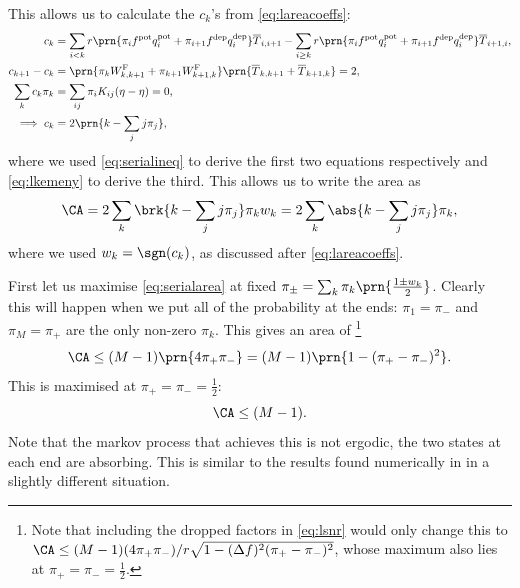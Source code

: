 \documentclass[12pt]{article}
\newcommand{\eqm}{\pi}
\newcommand{\fptm}{T}
\newcommand{\fptbm}{\overline{\fptm}}
\newcommand{\wm}{w}
\newcommand{\w}{\mathbf{\wm}}
\newcommand{\Wm}{W}
\newcommand{\encm}{K}
\newcommand{\frgm}{\Wm^{\mathrm{F}}}
\newcommand{\pot}{^{\text{pot}}}
\newcommand{\dep}{^{\text{dep}}}
\begin{document}
This allows us to calculate the $c_k$'s from \cref{eq:lareacoeffs}:
%
\begin{equation}\label{eq:serialareacoeff}
\begin{aligned}
  c_k &= \sum_{i<k} r\prn{\eqm_{i} f\pot q\pot_i + \eqm_{i+1} f\dep q\dep_i} \fptbm_{i,i+1}
    - \sum_{i\geq k} r\prn{\eqm_{i} f\pot q\pot_i + \eqm_{i+1} f\dep q\dep_i} \fptbm_{i+1,i}
  ,\\
  c_{k+1} - c_k &= \prn{\eqm_{k} \frgm_{k,k+1} + \eqm_{k+1} \frgm_{k+1,k}}
                    \prn{\fptbm_{k,k+1} + \fptbm_{k+1,k}}
    = 2,\\
  \sum_k c_k \eqm_k &= \sum_{ij} \eqm_i \encm_{ij} (\eta-\eta) = 0,\\
  \implies c_k &= 2 \prn{k - \sum_j j\eqm_j},
\end{aligned}
\end{equation}
%
where we used \cref{eq:serialineq} to derive the first two equations respectively and \cref{eq:lkemeny} to derive the third. 
This allows us to write the area as
%
\begin{equation}\label{eq:serialarea}
  \CA = {2} \sum_k \brk{k - \sum_j j\eqm_j} \eqm_k \wm_k
    = {2} \sum_k \abs{k - \sum_j j\eqm_j} \eqm_k ,
\end{equation}
%
where we used $\wm_k=\sgn(c_k)$, as discussed after \cref{eq:lareacoeffs}.

First let us maximise \cref{eq:serialarea} at fixed $\eqm_\pm = \sum_k \eqm_k \prn{\frac{1\pm\wm_k}{2}}$.
Clearly this will happen when we put all of the probability at the ends: $\eqm_1=\eqm_-$ and $\eqm_M=\eqm_+$ are the only non-zero $\eqm_k$.
This gives an area of
\footnote{Note that including the dropped factors in \cref{eq:lsnr} would only change this to \(\CA \leq (M-1)(4\eqm_+\eqm_-)/r\sqrt{1 - (\Delta f)^2(\eqm_+ - \eqm_-)^2}\), whose maximum also lies at \(\eqm_+=\eqm_-= \frac{1}{2}\).}
%
\begin{equation}\label{eq:serialextarea}
  \CA \leq (M-1) \prn{4\eqm_+\eqm_-} = (M-1)\prn{1 - (\eqm_+ - \eqm_-)^2}.
\end{equation}
%
This is maximised at \(\eqm_+=\eqm_-= \frac{1}{2}\):
%
\begin{equation}\label{eq:maxarea}
  \CA \leq (M-1).
\end{equation}
%
Note that the markov process that achieves this is not ergodic, the two states at each end are absorbing. 
This is similar to the results found numerically in \cite{Barrett2008discrete} in a slightly different situation.
\end{document}
